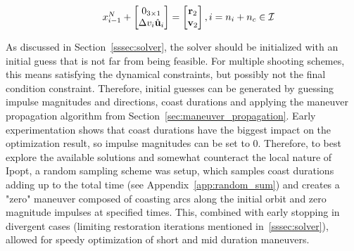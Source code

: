 \begin{align}
\begin{tabular}{cl}
                                & \(x_{i-1}^N + \begin{bmatrix}
                                    0_{3\times1} \\ \Delta v_i \hat{\mathbf{u}}_i
                                \end{bmatrix} = \begin{bmatrix}
                                    \mathbf{r}_2 \\ \mathbf{v}_2
                                \end{bmatrix}, i = n_i+n_c \in \mathcal{I}\)
    \end{tabular}
 \end{align}


As discussed in Section~\ref{sssec:solver}, the solver should be initialized with an initial guess that is not far from being feasible. For multiple shooting schemes, this means satisfying the dynamical constraints, but possibly not the final condition constraint. Therefore, initial guesses can be generated by guessing impulse magnitudes and directions, coast durations and applying the maneuver propagation algorithm from Section~\ref{sec:maneuver_propagation}. Early experimentation shows that coast durations have the biggest impact on the optimization result, so impulse magnitudes can be set to 0. Therefore, to best explore the available solutions and somewhat counteract the local nature of Ipopt, a random sampling scheme was setup, which samples coast durations adding up to the total time (see Appendix~\ref{app:random_sum}) and creates a "zero" maneuver composed of coasting arcs along the initial orbit and zero magnitude impulses at specified times. This, combined with early stopping in divergent cases (limiting restoration iterations mentioned in~\ref{sssec:solver}), allowed for speedy optimization of short and mid duration maneuvers.

